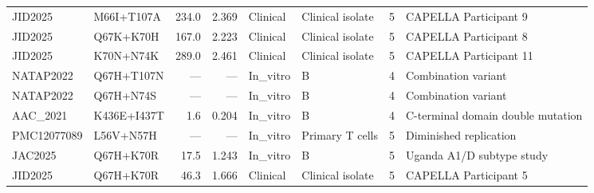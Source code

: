 {\begin{longtable}{p{1.3cm}p{1.8cm}rrp{1.0cm}p{1.5cm}cp{3.2cm}}
JID2025       & M66I+T107A        & 234.0  & 2.369 & Clinical & Clinical isolate & 5 & CAPELLA Participant 9 \\
JID2025       & Q67K+K70H         & 167.0  & 2.223 & Clinical & Clinical isolate & 5 & CAPELLA Participant 8 \\
JID2025       & K70N+N74K         & 289.0  & 2.461 & Clinical & Clinical isolate & 5 & CAPELLA Participant 11 \\
NATAP2022     & Q67H+T107N        & ---    & ---   & In\_vitro & B             & 4 & Combination variant \\
NATAP2022     & Q67H+N74S         & ---    & ---   & In\_vitro & B             & 4 & Combination variant \\
AAC\_2021     & K436E+I437T       & 1.6    & 0.204 & In\_vitro & B             & 4 & C-terminal domain double mutation \\
PMC12077089   & L56V+N57H         & ---    & ---   & In\_vitro & Primary T cells & 5 & Diminished replication \\
JAC2025       & Q67H+K70R         & 17.5   & 1.243 & In\_vitro & B             & 5 & Uganda A1/D subtype study \\
JID2025       & Q67H+K70R         & 46.3   & 1.666 & Clinical & Clinical isolate & 5 & CAPELLA Participant 5 \\
\end{longtable}
}